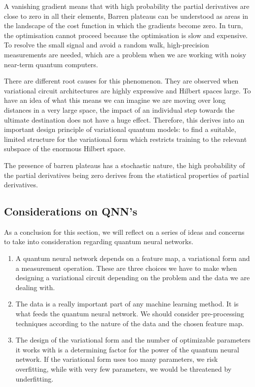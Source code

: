 A vanishing gradient means that with high probability the partial derivatives are close to zero in all their elements, Barren plateaus can be understood as areas in the landscape of the cost function in which the gradients become zero. In turn, the optimisation cannot proceed because the optimisation is slow and expensive. To resolve the small signal and avoid a random walk, high-precision measurements are needed, which are a problem when we are working with noisy near-term quantum computers.

There are different root causes for this phenomenon. They are observed when variational circuit architectures are highly expressive and Hilbert spaces large. To have an idea of what this means we can imagine we are moving over long distances in a very large space, the impact of an individual step towards the ultimate destination does not have a huge effect. Therefore, this derives into an important design principle of variational quantum models: to find a suitable, limited structure for the variational form which restricts training to the relevant subspace of the enormous Hilbert space.

The presence of barren plateaus has a stochastic nature, the high probability of the partial derivatives being zero derives from the statistical properties of partial derivatives. 


\subsection{Considerations on QNN's}

As a conclusion for this section, we will reflect on a series of ideas and concerns to take into consideration regarding quantum neural networks.

\begin{enumerate}
    \item A quantum neural network depends on a feature map, a variational form and a measurement operation. These are three choices we have to make when designing a variational circuit depending on the problem and the data we are dealing with. 

    \item The data is a really important part of any machine learning method. It is what feeds the quantum neural network. We should consider pre-processing techniques according to the nature of the data and the chosen feature map.

    \item The design of the variational form and the number of optimizable parameters it works with is a determining factor for the power of the quantum neural network. If the variational form uses too many parameters, we risk overfitting, while with very few parameters, we would be threatened by underfitting.
    
\end{enumerate}

\nocite{*}

\endinput
